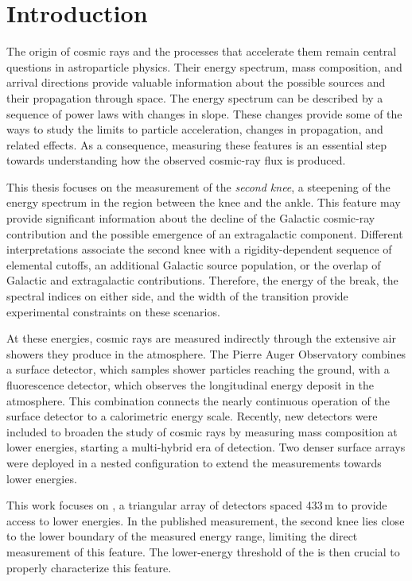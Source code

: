 \documentclass[main.tex]{subfiles}
\begin{document}
\chapter{Introduction}
\label{chapter:intro}

The origin of cosmic rays and the processes that accelerate them remain central questions in astroparticle physics.
Their energy spectrum, mass composition, and arrival directions provide valuable information about the possible sources and their propagation through space.
The energy spectrum can be described by a sequence of power laws with changes in slope.
These changes provide some of the ways to study the limits to particle acceleration, changes in propagation, and related effects.
As a consequence, measuring these features is an essential step towards understanding how the observed cosmic-ray flux is produced.

This thesis focuses on the measurement of the \emph{second knee}, a steepening of the energy spectrum in the region between the knee and the ankle.
This feature may provide significant information about the decline of the Galactic cosmic-ray contribution and the possible emergence of an extragalactic component.
Different interpretations associate the second knee with a rigidity-dependent sequence of elemental cutoffs, an additional Galactic source population, or the overlap of Galactic and extragalactic contributions.
Therefore, the energy of the break, the spectral indices on either side, and the width of the transition provide experimental constraints on these scenarios.

At these energies, cosmic rays are measured indirectly through the extensive air showers they produce in the atmosphere.
The Pierre Auger Observatory combines a surface detector, which samples shower particles reaching the ground, with a fluorescence detector, which observes the longitudinal energy deposit in the atmosphere.
This combination connects the nearly continuous operation of the surface detector to a calorimetric energy scale.
Recently, new detectors were included to broaden the study of cosmic rays by measuring mass composition at lower energies, starting a multi-hybrid era of detection.
Two denser surface arrays were deployed in a nested configuration to extend the measurements towards lower energies.

This work focuses on , a triangular array of detectors spaced 433\,m to provide access to lower energies.
In the published  measurement, the second knee lies close to the lower boundary of the measured energy range, limiting the direct measurement of this feature.
The lower-energy threshold of the  is then crucial to properly characterize this feature.
\end{document}

